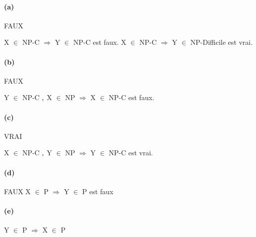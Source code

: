 \documentclass[a4paper, 12pt]{article}
\begin{document}
\paragraph{(a)}

FAUX

X $\in$ NP-C $\Rightarrow$ Y $\in$ NP-C est faux. 
X $\in$ NP-C $\Rightarrow$ Y $\in$ NP-Difficile est vrai. 

\paragraph{(b)}

FAUX

Y $\in$ NP-C $\and$ X $\in$ NP $\Rightarrow$ X $\in$ NP-C est faux.

\paragraph{(c)}

VRAI

X $\in$ NP-C $\and$ Y $\in$ NP $\Rightarrow$ Y $\in$ NP-C est vrai.

\paragraph{(d)}

FAUX
X $\in$ P $\Rightarrow$ Y $\in$ P est faux

\paragraph{(e)}

Y $\in$ P $\Rightarrow$ X $\in$ P
\end{document}
